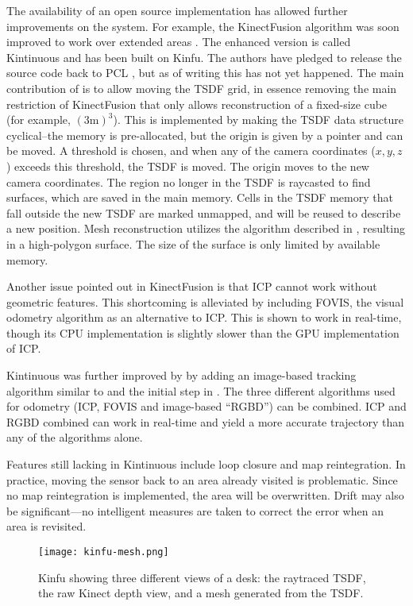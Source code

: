 The availability of an open source implementation has allowed further improvements on the system. For example, the KinectFusion algorithm was soon improved to work over extended areas \citep{Whelan12rssw}. The enhanced version is called Kintinuous and has been built on Kinfu. The authors have pledged to release the source code back to PCL , but as of writing this has not yet happened. The main contribution of \citet{Whelan12rssw} is to allow moving the TSDF grid, in essence removing the main restriction of KinectFusion that only allows reconstruction of a fixed-size cube (for example, $(3 \mathrm{m})^3$). This is implemented by making the TSDF data structure cyclical--the memory is pre-allocated, but the origin is given by a pointer and can be moved. A threshold is chosen, and when any of the camera coordinates ($x, y, z$) exceeds this threshold, the TSDF is moved. The origin moves to the new camera coordinates. The region no longer in the TSDF is raycasted to find surfaces, which are saved in the main memory. Cells in the TSDF memory that fall outside the new TSDF are marked unmapped, and will be reused to describe a new position. Mesh reconstruction utilizes the algorithm described in , resulting in a high-polygon surface. The size of the surface is only limited by available memory. \citep{Whelan12rssw}

Another issue pointed out in KinectFusion is that ICP cannot work without geometric features. This shortcoming is alleviated by including FOVIS, the visual odometry algorithm as an alternative to ICP. This is shown to work in real-time, though its CPU implementation is slightly slower than the GPU implementation of ICP. \citep{Whelan12rssw}

Kintinuous was further improved by \citet{Whelan12tr} by adding an image-based tracking algorithm similar to \citep{tykkala2011direct} and the initial step in \citep{huang2011visual}. The three different algorithms used for odometry (ICP, FOVIS and image-based ``RGBD'') can be combined. ICP and RGBD combined can work in real-time and yield a more accurate trajectory than any of the algorithms alone. \citep{Whelan12tr}

Features still lacking in Kintinuous include loop closure and map reintegration. In practice, moving the sensor back to an area already visited is problematic. Since no map reintegration is implemented, the area will be overwritten. Drift may also be significant---no intelligent measures are taken to correct the error when an area is revisited.

\begin{figure}
    \centering
    \texttt{[image: kinfu-mesh.png]}
    \caption{Kinfu showing three different views of a desk: the raytraced TSDF, the raw Kinect depth view, and a mesh generated from the TSDF.}
    \label{fig:kinfu-mesh}
\end{figure}
